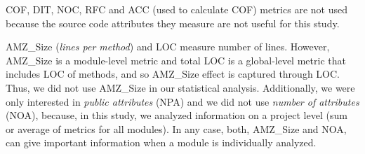 \documentclass[conference]{IEEEtran}
\newcommand{\TODO}[1]{{\color{red}\textbf{\uwave{#1}}}}
\begin{document}
COF, DIT, NOC, RFC and ACC (used to calculate COF) metrics are not used because the
source code attributes they measure are not useful for this study. 

AMZ\_Size (\emph{lines per method}) and LOC
measure number of lines. However, AMZ\_Size is a module-level metric and total 
LOC is a global-level metric that includes LOC of methods, and so AMZ\_Size effect is captured through LOC. Thus,
we did not use AMZ\_Size in our statistical analysis.
%
Additionally, we were only interested in \emph{public attributes} (NPA) and
we did not use \emph{number of attributes} (NOA), because, in this study,
we analyzed information on a project level (sum or average of metrics for all modules).
%
In any case, both, AMZ\_Size and NOA, can give important information when a module is
individually analyzed.
\end{document}
